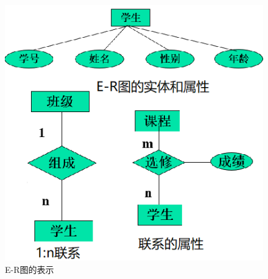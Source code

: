 \documentclass[main.tex]{subfiles}
\begin{document}
\begin{figure}[H]
    \centering
    \includegraphics[scale=0.8]{./images/0019.png}
    \caption{E-R图的表示}
\end{figure}
\end{document}
